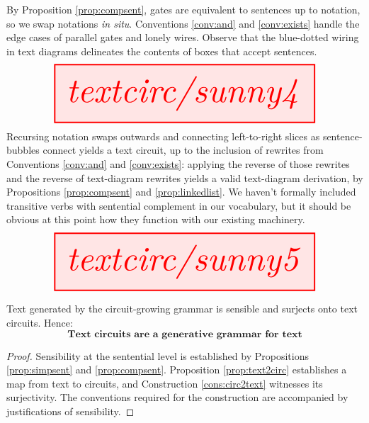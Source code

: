 \clearpage

\begin{myboxB}
By Proposition \ref{prop:compsent}, gates are equivalent to sentences up to notation, so we swap notations \emph{in situ}. Conventions \ref{conv:and} and \ref{conv:exists} handle the edge cases of parallel gates and lonely wires. Observe that the blue-dotted wiring in text diagrams delineates the contents of boxes that accept sentences.
\[
\resizebox{0.9\textwidth}{!}{\tikzfig{textcirc/sunny4}}
\]
Recursing notation swaps outwards and connecting left-to-right slices as sentence-bubbles connect yields a text circuit, up to the inclusion of rewrites from Conventions \ref{conv:and} and \ref{conv:exists}: applying the reverse of those rewrites and the reverse of text-diagram rewrites yields a valid text-diagram derivation, by Propositions \ref{prop:compsent} and \ref{prop:linkedlist}. We haven't formally included transitive verbs with sentential complement in our vocabulary, but it should be obvious at this point how they function with our existing machinery.
\[
\resizebox{0.9\textwidth}{!}{\tikzfig{textcirc/sunny5}}
\]
\end{myboxB}

\newpage
\clearpage

\begin{myboxB}
\begin{theorem}
Text generated by the circuit-growing grammar is sensible and surjects onto text circuits. Hence:
\[\textbf{Text circuits are a generative grammar for text}\]
\begin{proof}
Sensibility at the sentential level is established by Propositions \ref{prop:simpsent} and \ref{prop:compsent}. Proposition \ref{prop:text2circ} establishes a map from text to circuits, and Construction \ref{cons:circ2text} witnesses its surjectivity. The conventions required for the construction are accompanied by justifications of sensibility.
\end{proof}
\end{theorem}
\end{myboxB}

\clearpage
\newpage
